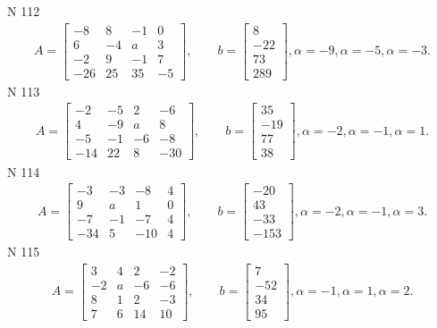 \documentclass[11pt]{report}
\begin{document}
N 112
\begin{align*}
 A = \left[\begin{matrix}-8 & 8 & -1 & 0\\6 & -4 & a & 3\\-2 & 9 & -1 & 7\\-26 & 25 & 35 & -5\end{matrix}\right],
    \qquad b = \left[\begin{matrix}8\\-22\\73\\289\end{matrix}\right], \alpha = -9, \alpha = -5, \alpha = -3. 
 \end{align*}
N 113
\begin{align*}
 A = \left[\begin{matrix}-2 & -5 & 2 & -6\\4 & -9 & a & 8\\-5 & -1 & -6 & -8\\-14 & 22 & 8 & -30\end{matrix}\right],
    \qquad b = \left[\begin{matrix}35\\-19\\77\\38\end{matrix}\right], \alpha = -2, \alpha = -1, \alpha = 1. 
 \end{align*}
N 114
\begin{align*}
 A = \left[\begin{matrix}-3 & -3 & -8 & 4\\9 & a & 1 & 0\\-7 & -1 & -7 & 4\\-34 & 5 & -10 & 4\end{matrix}\right],
    \qquad b = \left[\begin{matrix}-20\\43\\-33\\-153\end{matrix}\right], \alpha = -2, \alpha = -1, \alpha = 3. 
 \end{align*}
N 115
\begin{align*}
 A = \left[\begin{matrix}3 & 4 & 2 & -2\\-2 & a & -6 & -6\\8 & 1 & 2 & -3\\7 & 6 & 14 & 10\end{matrix}\right],
    \qquad b = \left[\begin{matrix}7\\-52\\34\\95\end{matrix}\right], \alpha = -1, \alpha = 1, \alpha = 2. 
 \end{align*}
\end{document}
